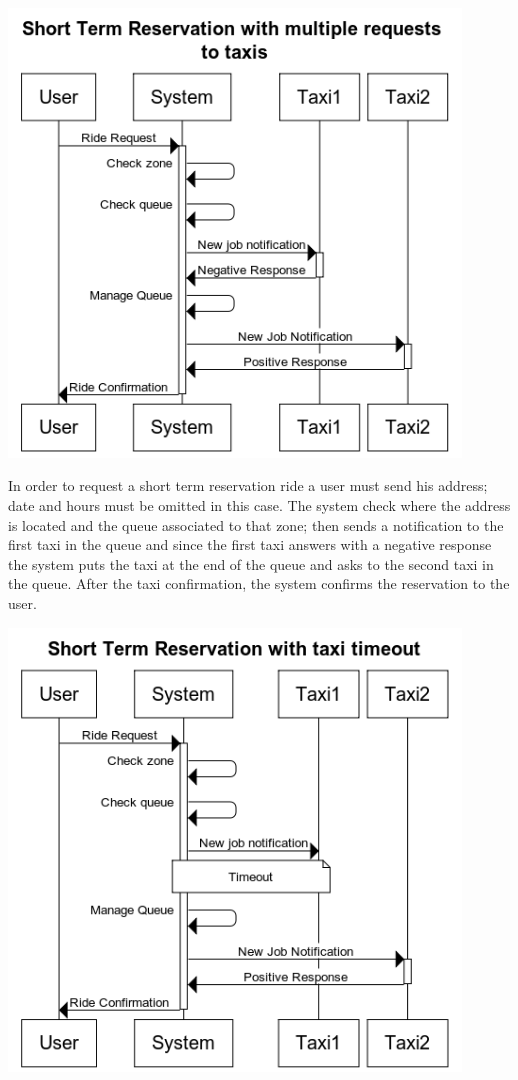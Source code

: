 		\newpage
	\begin{center}
		\includegraphics[width=0.90\textwidth]{./images/Short_Term_Reservation_with_multiple_requests_to_taxis}
	\end{center}
	In order to request a short term reservation ride a user must send his address; date and hours must be omitted in this case. The system check where the address is located and the queue associated to that zone; then sends a notification to the first taxi in the queue and since the first taxi answers with a negative response the system puts the taxi at the end of the queue and asks to the second taxi in the queue. After the taxi confirmation, the system confirms the reservation to the user.
		\newpage
	\begin{center}
		\includegraphics[width=0.90\textwidth]{./images/Short_Term_Reservation_with_taxi_timeout}
	\end{center}
